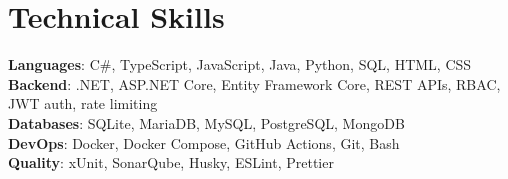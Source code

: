 \section{Technical Skills}
    \begin{itemize}[leftmargin=0.15in, label={}]
	\small{\item{
		\textbf{Languages}{: C\#, TypeScript, JavaScript, Java, Python, SQL, HTML, CSS} \\
		\textbf{Backend}{: .NET, ASP.NET Core, Entity Framework Core, REST APIs, RBAC, JWT auth, rate limiting} \\
		\textbf{Databases}{: SQLite, MariaDB, MySQL, PostgreSQL, MongoDB} \\
		\textbf{DevOps}{: Docker, Docker Compose, GitHub Actions, Git, Bash} \\
		\textbf{Quality}{: xUnit, SonarQube, Husky, ESLint, Prettier}
	}}
    \end{itemize}
